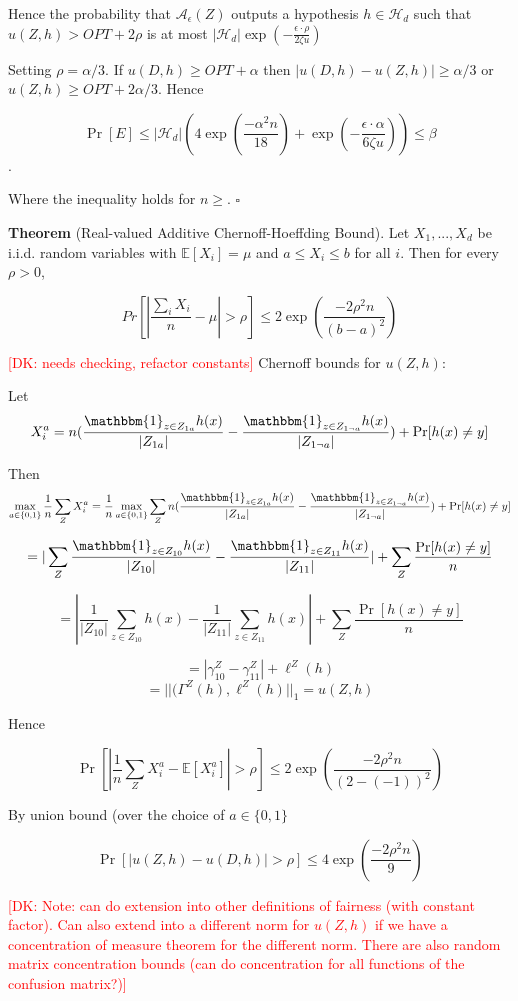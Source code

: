 \documentclass[format = sigconf]{acmart}
\newcommand{\dk}[1]{\textcolor{red}{[DK: #1]}}
\newcommand{\A}{\mathcal{A}}
\renewcommand{\H}{\mathcal{H}}
\newcommand{\1}{\mathbbm{1}}
\newcommand{\eps}{\epsilon}
\newcommand{\zt}{\zeta}
\newcommand{\z}[1]{Z_{#1}}
\theoremstyle{definition}
\begin{document}
Hence the probability that $\A_\eps(Z)$ outputs a hypothesis $h \in \H_d$ such that $u(Z,h) > OPT + 2\rho$ is at most $|\H_d|\exp(-\frac{\eps\cdot\rho}{2\zt u})$

Setting $\rho = \alpha/3$. If $u(D,h) \geq OPT + \alpha$ then $|u(D,h) - u(Z,h)| \geq \alpha/3$ or $u(Z,h) \geq OPT + 2\alpha/3$. Hence

$$\Pr[E] \leq |\H_d|(4\exp(\frac{-\alpha^2n}{18}) + \exp(-\frac{\eps\cdot\alpha}{6\zt u})) \leq \beta$$.

Where the inequality holds for $n \geq $. $\square$

{\bf Theorem} (Real-valued Additive Chernoff-Hoeffding Bound). Let $X_1,...,X_d$ be i.i.d. random variables with $\mathbb{E}[X_i] = \mu$ and $a \leq X_i \leq b$ for all $i$. Then for every $\rho > 0$,

$$Pr[|\frac{\sum_i X_i}{n} - \mu| > \rho] \leq 2\exp(\frac{-2\rho^2n}{(b-a)^2})$$

\dk {needs checking, refactor constants}
Chernoff bounds for $u(Z,h)$:

Let $$X_i^a = n(\frac{\1_{z\in Z_{1a}}h(x)}{|Z_{1a}|} - \frac{\1_{z\in Z_{1\neg a}}h(x)}{|Z_{1 \neg a}|} ) + \Pr[h(x) \neq y]$$

Then $$\max_{a\in \{0,1\}}\frac{1}{n} \sum_Z X_i^a =\frac{1}{n}  \max_{a\in \{0,1\}} \sum_Z n(\frac{\1_{z\in Z_{1a}}h(x)}{|Z_{1a}|} - \frac{\1_{z\in Z_{1\neg a}}h(x)}{|Z_{1 \neg a}|} ) + \Pr[h(x) \neq y]$$

$$= |\sum_Z \frac{\1_{z\in \z{10}}h(x)}{|\z{10}|} - \frac{\1_{z\in Z_{11}}h(x)}{|Z_{11}|}| +  \sum_Z \frac{\Pr[h(x) \neq y] }{n}$$

$$= |\frac{1}{|\z{10}|} \sum_{z\in \z{10}} h(x) - \frac{1}{|Z_{11}|} \sum_{z\in Z_{11}} h(x)| +  \sum_Z \frac{\Pr[h(x) \neq y] }{n}$$

$$=|\gamma_{10}^Z - \gamma_{11}^Z| + \ell^Z(h) $$
$$=||(\Gamma^Z(h), \ell^Z(h)||_{1} = u(Z,h)$$

Hence

$$\Pr[|\frac{1}{n} \sum_Z X_i^a - \mathbb{E}[X_i^a]| > \rho] \leq 2\exp(\frac{-2\rho^2n}{(2-(-1))^2})$$

By union bound (over the choice of $a \in \{0,1\}$

$$\Pr[|u(Z,h) - u(D,h)| > \rho] \leq 4\exp(\frac{-2\rho^2n}{9})$$

\dk {Note: can do extension into other definitions of fairness (with constant factor).
Can also extend into a different norm for $u(Z,h)$ if we have a concentration of measure theorem for the different norm. There are also random matrix concentration bounds (can do concentration for all functions of the confusion matrix?)}
\end{document}
